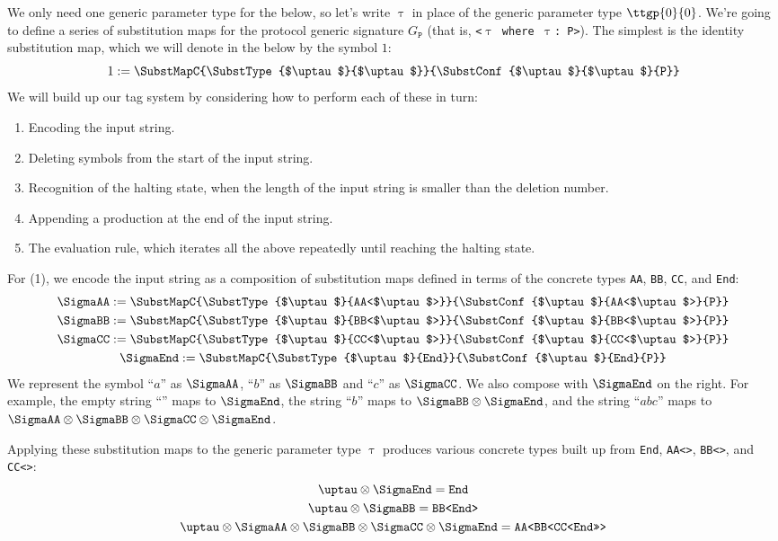 \documentclass[../generics]{subfiles}
\begin{document}
We only need one generic parameter type for the below, so let's write $\uptau$ in place of the generic parameter type $\ttgp{0}{0}$. We're going to define a series of substitution maps for the protocol generic signature $G_\texttt{P}$ (that is, \texttt{<$\uptau$ where $\uptau$:~P>}). The simplest is the identity substitution map, which we will denote in the below by the symbol $1$:
\[1 := \SubstMapC{\SubstType{$\uptau$}{$\uptau$}}{\SubstConf{$\uptau$}{$\uptau$}{P}}\]
We will build up our tag system by considering how to perform each of these in turn:
\begin{enumerate}
\item Encoding the input string.
\item Deleting symbols from the start of the input string.
\item Recognition of the halting state, when the length of the input string is smaller than the deletion number.
\item Appending a production at the end of the input string.
\item The evaluation rule, which iterates all the above repeatedly until reaching the halting state.
\end{enumerate}

For (1), we encode the input string as a composition of substitution maps defined in terms of the concrete types \texttt{AA}, \texttt{BB}, \texttt{CC}, and \texttt{End}:
\begin{gather*}
\SigmaAA := \SubstMapC{\SubstType{$\uptau$}{AA<$\uptau$>}}{\SubstConf{$\uptau$}{AA<$\uptau$>}{P}}\\
\SigmaBB := \SubstMapC{\SubstType{$\uptau$}{BB<$\uptau$>}}{\SubstConf{$\uptau$}{BB<$\uptau$>}{P}}\\
\SigmaCC := \SubstMapC{\SubstType{$\uptau$}{CC<$\uptau$>}}{\SubstConf{$\uptau$}{CC<$\uptau$>}{P}}\\
\SigmaEnd := \SubstMapC{\SubstType{$\uptau$}{End}}{\SubstConf{$\uptau$}{End}{P}}
\end{gather*}
We represent the symbol ``$a$'' as $\SigmaAA$, ``$b$'' as $\SigmaBB$ and ``$c$'' as $\SigmaCC$. We also compose with $\SigmaEnd$ on the right. For example, the empty string ``'' maps to $\SigmaEnd$, the string ``$b$'' maps to $\SigmaBB\otimes\SigmaEnd$, and the string ``$abc$'' maps to $\SigmaAA\otimes\SigmaBB\otimes\SigmaCC\otimes\SigmaEnd$.

Applying these substitution maps to the generic parameter type $\uptau$ produces various concrete types built up from \texttt{End}, \texttt{AA<>}, \texttt{BB<>}, and \texttt{CC<>}:
\begin{gather*}
\uptau\otimes\SigmaEnd = \texttt{End}\\
\uptau\otimes\SigmaBB = \texttt{BB<End>}\\
\uptau\otimes\SigmaAA\otimes\SigmaBB\otimes\SigmaCC\otimes\SigmaEnd = \texttt{AA<BB<CC<End>>>}
\end{gather*}
\end{document}

